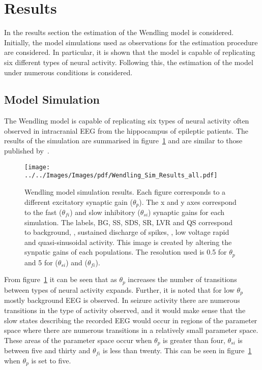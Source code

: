 \section{Results}

In the results section the estimation of the Wendling model is considered. Initially, the model simulations used as observations for the estimation procedure are considered. In particular, it is shown that the model is capable of replicating six different types of neural activity. Following this, the estimation of the model under numerous conditions is considered. 

\subsection{Model Simulation}

The Wendling model is capable of replicating six types of neural activity often observed in intracranial EEG from the hippocampus of epileptic patients. The results of the simulation are summarised in figure~\ref{fig: SimResults} and are similar to those published by~\cite{wendling2002epileptic}. 
\begin{figure}%
	\centering
		\texttt{[image: ../../Images/Images/pdf/Wendling\_Sim\_Results\_all.pdf]}
	\caption{Wendling model simulation results. Each figure corresponds to a different excitatory synaptic gain ($\theta_{p}$). The x and y axes correspond to the fast ($\theta_{fi}$) and slow inhibitory ($\theta_{si}$) synaptic gains for each simulation. The labels, BG, SS, SDS, SR, LVR and QS correspond to background, , sustained discharge of spikes, , low voltage rapid and quasi-sinusoidal activity. This image is created by altering the synpatic gains of each populations. The resolution used is 0.5 for $\theta_{p}$ and 5 for ($\theta_{si}$) and ($\theta_{fi}$).}
	\label{fig: SimResults}
\end{figure}%


From figure~\ref{fig: SimResults} it can be seen that as $\theta_{p}$ increases the number of transitions between types of neural activity expands. Further, it is noted that for low $\theta_{p}$ mostly background EEG is observed. In seizure activity there are numerous transitions in the type of activity observed, and it would make sense that the slow states describing the recorded EEG would occur in regions of the parameter space where there are numerous transitions in a relatively small parameter space. These areas of the parameter space occur when $\theta_{p}$ is greater than four, $\theta_{si}$ is between five and thirty and $\theta_{fi}$ is less than twenty. This can be seen in figure~\ref{fig: SimResults} when $\theta_{p}$ is set to five. 

